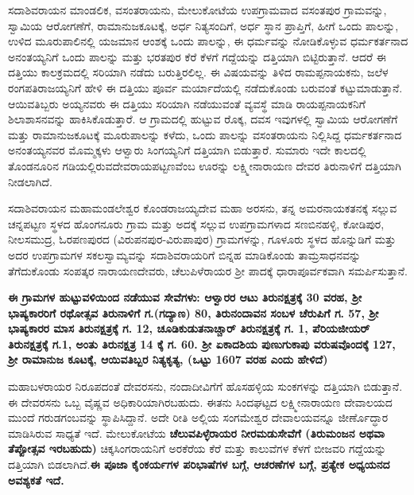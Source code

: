 ಸದಾಶಿವರಾಯನ ಮಾಂಡಲಿಕ, ವಸಂತರಾಯನು, ಮೇಲುಕೋಟೆಯ ಉಪಗ್ರಾಮವಾದ ವಸಂತಪುರ ಗ್ರಾಮವನ್ನು, ಸ್ವಾಮಿಯ ಆರೋಗಣೆಗೆ, ರಾಮಾನುಜಕೂಟಕ್ಕೆ, ಅರ್ಧ ನಿತ್ಯಸಂದಿಗೆ, ಅರ್ಧ ಸ್ಥಾನ ಪ್ರಾಪ್ತಿಗೆ, ಹೀಗೆ ಒಂದು ಪಾಲನ್ನು, ಉಳಿದ ಮೂರುಪಾಲಿನಲ್ಲಿ ಯಜಮಾನ ಆಂಶಕ್ಕೆ ಒಂದು ಪಾಲನ್ನು, ಈ ಧರ್ಮವನ್ನು ನೋಡಿಕೊಳ್ಳುವ ಧರ್ಮಕರ್ತನಾದ ಅನಂತಯ್ಯನಿಗೆ ಒಂದು ಪಾಲನ್ನು ಮತ್ತು ಭರತಪುರ ಕೆರೆ ಕೆಳಗೆ ಗದ್ದೆಯನ್ನು ದತ್ತಿಯಾಗಿ ಬಿಟ್ಟಿರುತ್ತಾನೆ. ಆದರೆ ಈ ದತ್ತಿಯು ಕಾಲಕ್ರಮದಲ್ಲಿ ಸರಿಯಾಗಿ ನಡೆದು ಬರುತ್ತಿರಲಿಲ್ಲ. ಈ ವಿಷಯವನ್ನು ತಿಳಿದ ರಾಮಪ್ಪನಾಯಕನು, ಜಲೆಳ ರಂಗಪತಿರಾಜಯ್ಯನಿಗೆ ಹೇಳಿ ಈ ದತ್ತಿಯು ಪೂರ್ವ ಮರ್ಯಾದೆಯಲ್ಲಿ ನಡೆದುಕೊಂಡು ಬರುವಂತೆ ಕಟ್ಟುಮಾಡುತ್ತಾನೆ. ಆಯಿವತಿಬ್ಬರು ಅಯ್ಯನವರು ಈ ದತ್ತಿಯು ಸರಿಯಾಗಿ ನಡೆಯುವಂತೆ ವ್ಯವಸ್ಥೆ ಮಾಡಿ ರಾಯಪ್ಪನಾಯಕನಿಗೆ ಶಿಲಾಶಾಸನವನ್ನು ಹಾಕಿಸಿಕೊಡುತ್ತಾರೆ. ಆ ಗ್ರಾಮದಲ್ಲಿ ಹುಟ್ಟುವ ರೊಕ್ಕ, ದವಸ ಇವುಗಳಲ್ಲಿ ಸ್ವಾಮಿಯ ಆರೋಗಣೆಗೆ ಮತ್ತು ರಾಮಾನುಜಕೂಟಕ್ಕೆ ಮೂರುಪಾಲನ್ನು ಕಳೆದು, ಒಂದು ಪಾಲನ್ನು ವಸಂತರಾಯನು ನಿಲ್ಲಿಸಿದ್ದ ಧರ್ಮಕರ್ತನಾದ ಅನಂತಯ್ಯನವರ ಮೊಮ್ಮಕ್ಕಳು ಆಳ್ವಾರು ಸಿಂಗಯ್ಯನಿಗೆ ದತ್ತಿಯಾಗಿ ಬಿಡುತ್ತಾರೆ. ಸುಮಾರು ಇದೇ ಕಾಲದಲ್ಲಿ ತೊಂಡನೂರಿನ ಗಡಿಯಲ್ಲಿರುವ\break ದೇವರಾಯಪಟ್ಟಣವೆಂಬ ಊರನ್ನು ಲಕ್ಷ್ಮೀನಾರಾಯಣ ದೇವರ ತಿರುನಾಳಿಗೆ ದತ್ತಿಯಾಗಿ ನೀಡಲಾಗಿದೆ.

ಸದಾಶಿವರಾಯನ ಮಹಾಮಂಡಲೇಶ್ವರ ಕೊಂಡರಾಜಯ್ಯದೇವ ಮಹಾ ಅರಸನು, ತನ್ನ ಅಮರನಾಯಕತನಕ್ಕೆ ಸಲ್ಲುವ ಚನ್ನಪಟ್ಟಣ ಸ್ಥಳದ ಹೊಂಗನೂರು ಗ್ರಾಮ ಮತ್ತು ಅದಕ್ಕೆ ಸಲ್ಲುವ ಉಪಗ್ರಾಮಗಳಾದ ಸಣಬಿನಹಳ್ಳಿ, ಕೋಡಿಪುರ, ನೀಲಸಮುದ್ರ, ಓರಪಣಪುರದ (ವಿರುಪನಪುರ-ವಿರುಪಾಪುರ) ಗ್ರಾಮಗಳನ್ನು, ಗೂಳೂರು ಸ್ಥಳದ ಹೊನ್ನುಡಿಗೆ ಮತ್ತು ಅದರ ಉಪಗ್ರಾಮಗಳ ಸಕಲಸ್ವಾಮ್ಯವನ್ನು ಸದಾಶಿವರಾಯರಿಗೆ ಬಿನ್ನಹ ಮಾಡಿಕೊಂಡು ತಾಮ್ರಸಾಧನವನ್ನು ತೆಗೆದುಕೊಂಡು ಸಂಪತ್ಕರ ನಾರಾಯಣದೇವರು, ಚೆಲುಪಿಳೆರಾಯರ ಶ‍್ರೀ ಪಾದಕ್ಕೆ ಧಾರಾಪೂರ್ವಕವಾಗಿ ಸಮರ್ಪಿಸುತ್ತಾನೆ.

\textbf{ಈ ಗ್ರಾಮಗಳ ಹುಟ್ಟುವಳಿಯಿಂದ ನಡೆಯುವ ಸೇವೆಗಳು: ಆಳ್ವಾರರ ಆಟು ತಿರುನಕ್ಷತ್ರಕ್ಕೆ 30 ವರಹ, ಶ‍್ರೀ ಭಾಷ್ಯಕಾರರಿಗೆ ರಥೋತ್ಸವ ತಿರುನಾಳಿಗೆ ಗ.(ಗದ್ಯಾಣ) 80, ತಿರುನಂದಾವನ ಸಂಬಳ ಚೆರುಪಿಗೆ ಗ. 57, ಶ‍್ರೀ ಭಾಷ್ಯಕಾರರ ಮಾಸ ತಿರುನಕ್ಷತ್ರಕ್ಕೆ ಗ. 12, ಚೂಡಿಕುಡುತನಾಚ್ಚಾರ್​ ತಿರುನಕ್ಷತ್ರಕ್ಕೆ ಗ. 1, ಪೆರಿಯಜೀಯರ್​ ತಿರುನಕ್ಷತ್ರಕ್ಕೆ ಗ.1, ಅಂತು ತಿರುನಕ್ಷತ್ರ 14 ಕ್ಕೆ ಗ. 60. ಶ‍್ರೀ ಏಕಾದಶಿಯ ಪುಣುಗುಕಾಪು ವರುಷವೊಂದಕ್ಕೆ 127, ಶ‍್ರೀ ರಾಮಾನುಜ ಕೂಟಕ್ಕೆ, ಆಯಿವತಿಬ್ಬರ ನಿತ್ಯಕೃತ್ಯ, (ಒಟ್ಟು 1607 ವರಹ ಎಂದು ಹೇಳಿದೆ)}

ಮಹಾಬಳರಾಯರ ನಿರೂಪದಂತೆ ದೇವರಸನು, ನಂದಾದೀವಿಗೆಗೆ ಹೊಸಹಳ್ಳಿಯ ಸುಂಕಗಳನ್ನು ದತ್ತಿಯಾಗಿ ಬಿಡುತ್ತಾನೆ. ಈ ದೇವರಸನು ಒಬ್ಬ ವೈಷ್ಣವ ಅಧಿಕಾರಿಯಾಗಿರಬಹುದು. ಈತನು ಸಿಂದಘಟ್ಟದ ಲಕ್ಷ್ಮೀನಾರಾಯಣ ದೇವಾಲಯದ ಮುಂದೆ ಗರುಡಗಂಬವನ್ನು ಸ್ಥಾಪಿಸಿದ್ದಾನೆ. ಅದೇ ರೀತಿ ಅಲ್ಲಿಯ ಸಂಗಮೇಶ್ವರ ದೇವಾಲಯವನ್ನೂ ಜೀರ್ಣೊದ್ಧಾರ ಮಾಡಿಸಿರುವ ಸಾಧ್ಯತೆ ಇದೆ. ಮೇಲುಕೋಟೆಯ \textbf{ಚೆಲುವಪಿಳ್ಳೆರಾಯರ ನೀರಮಡುಸೇವೆಗೆ (ತಿರುಮಂಜನ ಅಥವಾ ತೆಪ್ಪೋತ್ಸವ ಇರಬಹುದು) }ಚಿಕ್ಕಸಿಂಗರಾಯನಿಗೆ ಅರಕೆರೆಯ ಕೆರೆ ಮತ್ತು ಕಾಲುವೆಗಳ ಕೆಳಗೆ ಬೀಜವರಿ ಗದ್ದೆಯನ್ನು ದತ್ತಿಯಾಗಿ ಬಿಡಲಾಗಿದೆ.\textbf{ಈ ಪೂಜಾ ಕೈಂಕರ್ಯಗಳ ಪರಿಭಾಷೆಗಳ ಬಗ್ಗೆ, ಆಚರಣೆಗಳ ಬಗ್ಗೆ, ಪ್ರತ್ಯೇಕ ಅಧ್ಯಯನದ ಅವಶ್ಯಕತೆ ಇದೆ.}

